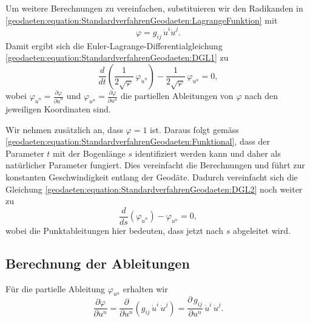 Um weitere Berechnungen zu vereinfachen, substituieren wir den Radikanden in \eqref{geodaeten:equation:StandardverfahrenGeodaeten:LagrangeFunktion} mit
\begin{equation}
	\varphi = g_{ij} \, \dot{u}^i \dot{u}^j.
	\label{geodaeten:equation:StandardverfahrenGeodaeten:Substitution}
\end{equation}
Damit ergibt sich die Euler-Lagrange-Differentialgleichung \eqref{geodaeten:equation:StandardverfahrenGeodaeten:DGL1} zu
\begin{equation}
	\frac{d}{dt} \left(\frac{1}{2 \sqrt{\varphi}} \, \varphi_{\dot{u}^n}\right) - \frac{1}{2 \sqrt{\varphi}} \, \varphi_{u^n} = 0,
	\label{geodaeten:equation:StandardverfahrenGeodaeten:DGL2}
\end{equation}
wobei $\varphi_{\dot{u}^n} = \frac{\partial \varphi}{\partial \dot{u}^n}$ und $\varphi_{u^n} = \frac{\partial \varphi}{\partial u^n}$ die partiellen Ableitungen von $\varphi$ nach den jeweiligen Koordinaten sind.

Wir nehmen zusätzlich an, dass $\varphi = 1$ ist. Daraus folgt gemäss \eqref{geodaeten:equation:StandardverfahrenGeodaeten:Funktional}, dass der Parameter $t$ mit der Bogenlänge $s$ identifiziert werden kann und daher als natürlicher Parameter fungiert.
Dies vereinfacht die Berechnungen und führt zur konstanten Geschwindigkeit entlang der Geodäte.
Dadurch vereinfacht sich die Gleichung \eqref{geodaeten:equation:StandardverfahrenGeodaeten:DGL2} noch weiter zu
\begin{equation}
	\frac{d}{ds} \left( \varphi_{\dot{u}^n} \right) - \varphi_{u^n} = 0,
	\label{geodaeten:equation:StandardverfahrenGeodaeten:DGL3}
\end{equation}
wobei die Punktableitungen hier bedeuten, dass jetzt nach $s$ abgeleitet wird.

\subsection{Berechnung der Ableitungen}
Für die partielle Ableitung $\varphi_{u^n}$ erhalten wir
\begin{equation} 
	\frac{\partial \varphi}{\partial u^n} = \frac{\partial}{\partial u^n} \left(g_{ij} \, \dot{u}^i \, \dot{u}^j\right) = \frac{\partial \, g_{ij}}{\partial u^n} \, \dot{u}^i \, \dot{u}^j. 
	\label{geodaeten:equation:StandardverfahrenGeodaeten:PartialPhi1}
\end{equation}

